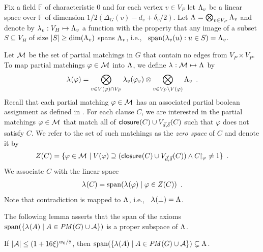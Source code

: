 \documentclass{article}
\newcommand{\set}[1]{\{ #1 \}}
\newcommand{\setdescr}[3][\mid]{\set{ #2 #1 #3 }}
\newcommand{\setsize}[1]{\lvert#1\rvert}
\newcommand{\introduceterm}[1]{{\emph{#1}}}
\newcommand{\eqperiod}{\enspace .}
\newcommand{\ie}{i.e.,\ }
\newcommand{\clc}{\ensuremath{C}}
\newcommand{\restrict}[2]{{{#1}\!\!\upharpoonright_{#2}}}
\newcommand{\formulaformat}[1]{\mathit{#1}}
\newcommand{\PM}{PM(G)}
\renewcommand{\PM}{\formulaformat{PM}(G)}
\renewcommand{\deg}[2][XXXXXXXXXXXX]{\Delta_{#1}(#2)}
\newcommand{\diff}{\xi}
\newcommand{\ontodimLi}{1/2(\deg[G]{v} - d_v + \delta_v/2)}
\newcommand{\V}[1][]{V_{#1}}
\newcommand{\Vp}{\V[P]}
\newcommand{\Vh}{\V[H]}
\newcommand{\Ax}{\ensuremath\mathcal{A}}
\newcommand{\vecthr}{\vec{d}}
\newcommand{\vecadv}{\vec{\delta}}
\newcommand{\linspace}[1][]{\ensuremath \Lambda_{{#1}}}
\newcommand{\linmap}[1][]{\ensuremath \lambda_{{#1}}}
\newcommand{\linmapof}[2][]{\linmap[#1](#2)}
\newcommand{\Vthick}[1]{\ensuremath V_{\vecthr,\vecadv}(#1)}
\newcommand{\closure}[2][]{\mathsf{closure}_{{#1}}(#2)}
\newcommand{\vmatch}[1]{V(#1)}
\newcommand{\matcha}{\varphi}
\newcommand{\matchings}[1][]{\ensuremath \mathcal{M}_{{#1}}}
\newcommand{\Null}[1]{\ensuremath Z(#1)}
\newcommand{\spans}[1]{\mathrm{span} ( #1 )}
\newcommand{\tensor}{\ensuremath \otimes}
\newcommand{\bigtensor}{\ensuremath \bigotimes}
\numberwithin{equation}{section}
\begin{document}
  Fix a field $\mathbb{F}$ of characteristic 0 and 
  for each vertex $v \in \Vp$ let $\linspace[v]$ be a linear space over $\mathbb{F}$ of 
  dimension $\ontodimLi$. Let
  $\linspace = \bigtensor_{v \in \Vp} \linspace[v]$ and denote by
  $\linmap[v]: \Vh \mapsto \linspace[v]$ a function with the 
  property that any image of a subset 
  $S \subseteq \Vh$ of size $\setsize{S} \ge \dim(\linspace[v])$ 
  spans $\linspace[v]$, \ie
  $\spans{\linmapof[v]{u} : u \in S} = \linspace[v]$.

  Let $\matchings$ be the set of partial matchings in $G$ that contain
  no edges from $\Vp \times \Vp$. To map partial matchings 
  $\matcha \in \matchings$ into $\linspace$,
  we define
  $\linmap : \matchings \mapsto \linspace$ by
  \begin{align}\label{eq:onto_lambda_def}
    \linmapof{\matcha} = 
    \bigtensor_{v \in \vmatch{\matcha} \cap \Vp} \linmapof[v]{\matcha_v} \tensor 
    \bigtensor_{ v \in \Vp \setminus \vmatch{\matcha}} \linspace[v] \eqperiod
  \end{align}
  Recall that each partial matching $\matcha \in \matchings$ has an
  associated partial boolean assignment as defined in
  .  For each clause $C$, we are
  interested in the partial matchings $\matcha \in \matchings$ that
  match all of $\closure{C} \cup \Vthick{C}$ such that
  ${\matcha}$ does not satisfy $C$. We refer to the set of
  such matchings as the \introduceterm{zero space} of $\clc$ and
  denote it by
  \begin{align}
    \Null{C} = \set{\matcha \in \matchings \mid 
    \vmatch{\matcha} \supseteq (\closure{C} \cup \Vthick{C}) 
    \wedge \restrict{C}{\matcha}\neq 1} \eqperiod
  \end{align}
  We associate $C$ with the linear space
  \begin{align}
    \linmapof{C} = \spans{ \linmapof{\matcha} \mid \matcha \in \Null{C}} 
    \eqperiod
  \end{align}
  Note that contradiction is mapped to $\linspace$, \ie
  $\linmapof{\bot} = \linspace$.
  
  The following lemma asserts that the span of the axioms
  $\spans{\setdescr{\linmapof{A}}{A \in \PM \cup \Ax}}$
  is a proper subspace of $\linspace$.
  
  \begin{lemma}\label{lem:onto_subspace}
    If $\setsize{\Ax} \le (1 + 16 \diff)^{w_0/8}$, then
    $\spans{\setdescr{\linmapof{A}}{A \in \PM \cup \Ax}} \subsetneq \linspace$.
  \end{lemma}
  
\end{document}
